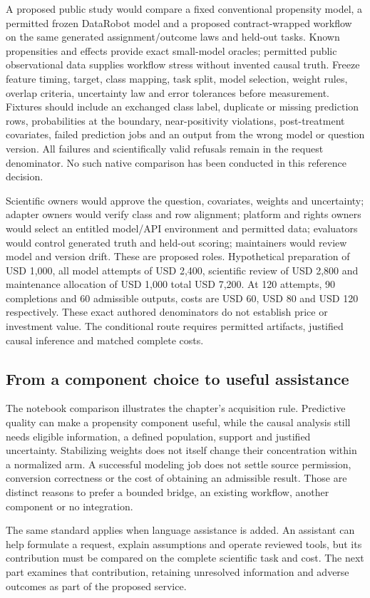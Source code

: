 A proposed public study would compare a fixed conventional propensity model,
a permitted frozen DataRobot model and a proposed contract-wrapped workflow on
the same generated assignment/outcome laws and held-out tasks. Known
propensities and effects provide exact small-model oracles; permitted public
observational data supplies workflow stress without invented causal truth.
Freeze feature timing, target, class mapping, task split, model selection,
weight rules, overlap criteria, uncertainty law and error tolerances before
measurement. Fixtures should include an exchanged class label, duplicate or
missing prediction rows, probabilities at the boundary, near-positivity
violations, post-treatment covariates, failed prediction jobs and an output
from the wrong model or question version. All failures and scientifically
valid refusals remain in the request denominator. No such native comparison
has been conducted in this reference decision.~\citep{exec25_datarobot_choice}

Scientific owners would approve the question, covariates, weights and
uncertainty; adapter owners would verify class and row alignment; platform and
rights owners would select an entitled model/API environment and permitted
data; evaluators would control generated truth and held-out scoring;
maintainers would review model and version drift. These are proposed roles.
Hypothetical preparation of USD 1,000, all model attempts of USD 2,400,
scientific review of USD 2,800 and maintenance allocation of USD 1,000 total
USD 7,200. At 120 attempts, 90 completions and 60 admissible outputs, costs are
USD 60, USD 80 and USD 120 respectively. These exact authored denominators do
not establish price or investment value. The conditional route requires
permitted artifacts, justified causal inference and matched complete costs.
\citep{exec25_datarobot_choice}

\subsection{From a component choice to useful assistance}

The notebook comparison illustrates the chapter's acquisition rule. Predictive
quality can make a propensity component useful, while the causal analysis
still needs eligible information, a defined population, support and justified
uncertainty. Stabilizing weights does not itself change their concentration
within a normalized arm. A successful modeling job does not settle source
permission, conversion correctness or the cost of obtaining an admissible
result. Those are distinct reasons to prefer a bounded bridge, an existing
workflow, another component or no integration.

The same standard applies when language assistance is added. An assistant can
help formulate a request, explain assumptions and operate reviewed tools, but
its contribution must be compared on the complete scientific task and cost.
The next part examines that contribution, retaining unresolved information
and adverse outcomes as part of the proposed service.
